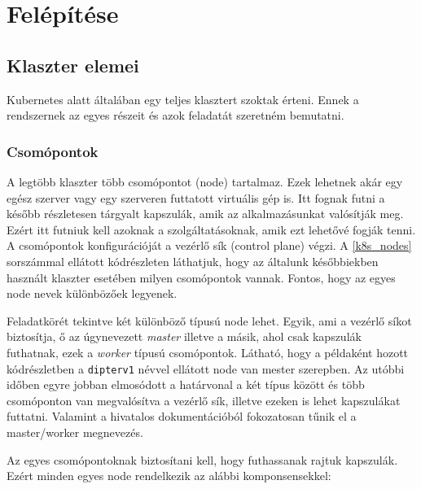 \section{Felépítése}

\subsection{Klaszter elemei}
Kubernetes alatt általában egy teljes klasztert szoktak érteni. Ennek a rendszernek az egyes részeit és azok feladatát szeretném bemutatni.  

\subsubsection{Csomópontok}
A legtöbb klaszter több csomópontot (node) tartalmaz. Ezek lehetnek akár egy egész szerver vagy egy szerveren futtatott virtuális gép is. Itt fognak futni a később részletesen tárgyalt kapszulák, amik az alkalmazásunkat valósítják meg. Ezért itt futniuk kell azoknak a szolgáltatásoknak, amik ezt lehetővé fogják tenni. A csomópontok konfigurációját a vezérlő sík (control plane) végzi. A \ref{k8s_nodes} sorszámmal ellátott kódrészleten láthatjuk, hogy az általunk későbbiekben használt klaszter esetében milyen csomópontok vannak. Fontos, hogy az egyes node nevek  különbözőek legyenek. 

Feladatkörét tekintve két különböző típusú node lehet. Egyik, ami a vezérlő síkot biztosítja, ő az úgynevezett \textit{master} illetve a másik, ahol csak kapszulák futhatnak, ezek a \textit{worker} típusú csomópontok. Látható, hogy a példaként hozott kódrészletben a \verb+dipterv1+ névvel ellátott node van mester szerepben. Az utóbbi időben egyre jobban elmosódott a határvonal a két típus között és több csomóponton van megvalósítva a vezérlő sík, illetve ezeken is lehet kapszulákat futtatni. Valamint a hivatalos dokumentációból fokozatosan tűnik el a master/worker megnevezés.\\

\lstset{caption=Később használt klaszter csomópontjai, label=k8s_nodes}


Az egyes csomópontoknak biztosítani kell, hogy futhassanak rajtuk kapszulák. Ezért minden egyes node rendelkezik az alábbi komponsensekkel:

